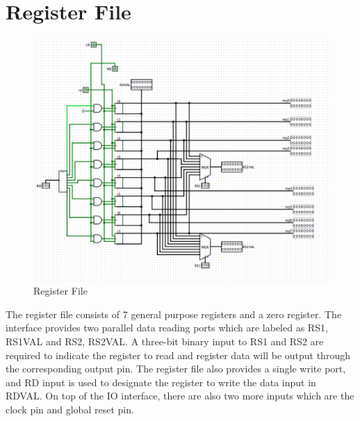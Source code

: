 \documentclass{article}
\begin{document}
	\section{Register File}
	\begin{figure}[H]
		\begin{center}
			\includegraphics[scale=0.5]{regfile}
			\caption{Register File}
		\end{center}
	\end{figure}
	The register file consists of 7 general purpose registers and a zero register. The interface provides two parallel data reading ports which are labeled as RS1, RS1VAL and RS2, RS2VAL. A three-bit binary input to RS1 and RS2 are required to indicate the register to read and register data will be output through the corresponding output pin. The register file also provides a single write port, and RD input is used to designate the register to write the data input in RDVAL. On top of the IO interface, there are also two more inputs which are the clock pin and global reset pin. 
	\clearpage
\end{document}
